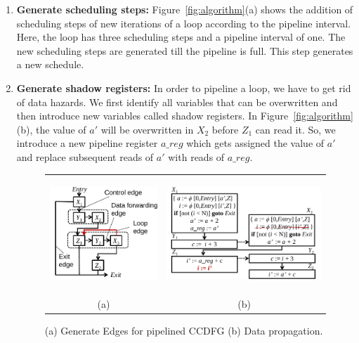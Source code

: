 \begin{enumerate}
\item {\bf Generate scheduling steps:} Figure~\ref{fig:algorithm}(a) shows the addition of scheduling steps of new iterations of a loop according to the pipeline interval. Here, the loop has three scheduling steps and a pipeline interval of one. The new scheduling steps are generated till the pipeline is full. This step generates a new schedule. 

\item {\bf Generate shadow registers:} In order to pipeline a loop, we have to get rid of data hazards. We first identify all variables that can be overwritten and then introduce new variables called shadow registers. In Figure~\ref{fig:algorithm}(b), the value of $a'$ will be overwritten in $X_2$ before $Z_1$ can read it. So, we introduce a new pipeline register $a\_reg$ which gets assigned the value of $a'$ and replace subsequent reads of $a'$ with reads of $a\_reg$.

\begin{figure}[t!]
\begin{center}
\begin{tabular}{cc}
\includegraphics[height=1.7in]{fig-rpe/generate-edges}
& %
\includegraphics[height=1.7in]{fig-rpe/data-forwarding}
\\
(a) & (b)
\end{tabular}
\end{center}
\caption{(a) Generate Edges for pipelined CCDFG (b) Data propagation.}
\label{fig:algorithm-2}
\end{figure}
 

\end{enumerate}
